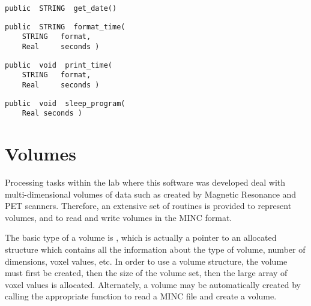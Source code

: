 
{\bf\begin{verbatim}
public  STRING  get_date()
\end{verbatim}}



{\bf\begin{verbatim}
public  STRING  format_time(
    STRING   format,
    Real     seconds )
\end{verbatim}}


{\bf\begin{verbatim}
public  void  print_time(
    STRING   format,
    Real     seconds )
\end{verbatim}}


{\bf\begin{verbatim}
public  void  sleep_program(
    Real seconds )
\end{verbatim}}


\chapter{Volumes}

Processing tasks within the lab where this software was developed
deal with multi-dimensional volumes of data such as created by
Magnetic Resonance and PET scanners.  Therefore, an extensive set of
routines is provided to represent volumes, and to read and write
volumes in the MINC format.

The basic type of a volume is , which is actually a
pointer to an allocated structure which contains all the information
about the type of volume, number of dimensions, voxel values, etc.  In
order to use a volume structure, the volume must first be created, then
the size of the volume set, then the large array of voxel values is
allocated.  Alternately, a volume may be automatically created by
calling the appropriate function to read a MINC file and create a
volume.

